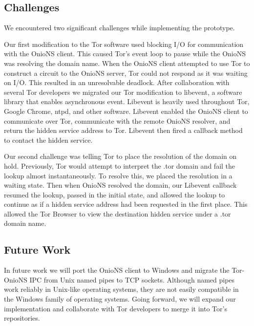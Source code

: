 \subsection{Challenges}

We encountered two significant challenges while implementing the prototype. 

Our first modification to the Tor software used blocking I/O for communication with the OnioNS client. This caused Tor's event loop to pause while the OnioNS was resolving the domain name. When the OnioNS client attempted to use Tor to construct a circuit to the OnioNS server, Tor could not respond as it was waiting on I/O. This resulted in an unresolvable deadlock. After collaboration with several Tor developers we migrated our Tor modification to libevent, a software library that enables asynchronous event. Libevent is heavily used throughout Tor, Google Chrome, ntpd, and other software. Libevent enabled the OnioNS client to communicate over Tor, communicate with the remote OnioNS resolver, and return the hidden service address to Tor. Libevent then fired a callback method to contact the hidden service.

Our second challenge was telling Tor to place the resolution of the domain on hold. Previously, Tor would attempt to interpret the .tor domain and fail the lookup almost instantaneously. To resolve this, we placed the resolution in a waiting state. Then when OnioNS resolved the domain, our Libevent callback resumed the lookup, passed in the initial state, and allowed the lookup to continue as if a hidden service address had been requested in the first place. This allowed the Tor Browser to view the destination hidden service under a .tor domain name.

\subsection{Future Work}

In future work we will port the OnioNS client to Windows and migrate the Tor-OnioNS IPC from Unix named pipes to TCP sockets. Although named pipes work reliably in Unix-like operating systems, they are not easily compatible in the Windows family of operating systems. Going forward, we will expand our implementation and collaborate with Tor developers to merge it into Tor's repositories.


%
%
%

